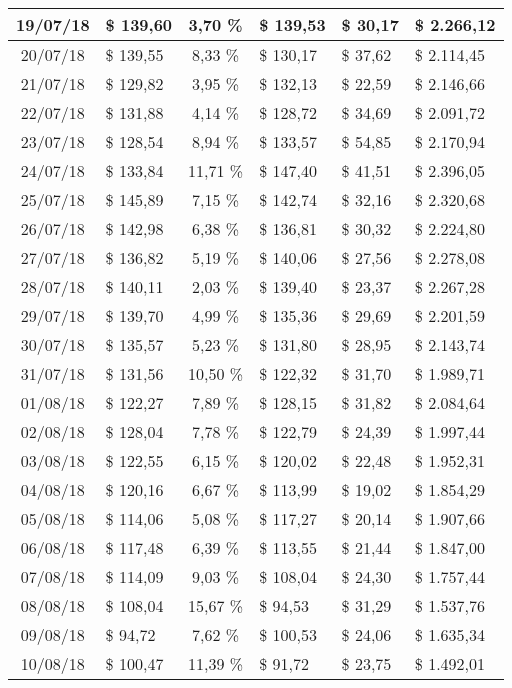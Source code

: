 \begin{center}
\begin{small}
\begin{longtable}{|c|l|c|l|l|l|}
19/07/18 & \$ 139,60 & 3,70 \% & \$ 139,53 & \$ 30,17 & \$ 2.266,12 \\ \hline
20/07/18 & \$ 139,55 & 8,33 \% & \$ 130,17 & \$ 37,62 & \$ 2.114,45 \\ \hline
21/07/18 & \$ 129,82 & 3,95 \% & \$ 132,13 & \$ 22,59 & \$ 2.146,66 \\ \hline
22/07/18 & \$ 131,88 & 4,14 \% & \$ 128,72 & \$ 34,69 & \$ 2.091,72 \\ \hline
23/07/18 & \$ 128,54 & 8,94 \% & \$ 133,57 & \$ 54,85 & \$ 2.170,94 \\ \hline
24/07/18 & \$ 133,84 & 11,71 \% & \$ 147,40 & \$ 41,51 & \$ 2.396,05 \\ \hline
25/07/18 & \$ 145,89 & 7,15 \% & \$ 142,74 & \$ 32,16 & \$ 2.320,68 \\ \hline
26/07/18 & \$ 142,98 & 6,38 \% & \$ 136,81 & \$ 30,32 & \$ 2.224,80 \\ \hline
27/07/18 & \$ 136,82 & 5,19 \% & \$ 140,06 & \$ 27,56 & \$ 2.278,08 \\ \hline
28/07/18 & \$ 140,11 & 2,03 \% & \$ 139,40 & \$ 23,37 & \$ 2.267,28 \\ \hline
29/07/18 & \$ 139,70 & 4,99 \% & \$ 135,36 & \$ 29,69 & \$ 2.201,59 \\ \hline
30/07/18 & \$ 135,57 & 5,23 \% & \$ 131,80 & \$ 28,95 & \$ 2.143,74 \\ \hline
31/07/18 & \$ 131,56 & 10,50 \% & \$ 122,32 & \$ 31,70 & \$ 1.989,71 \\ \hline
01/08/18 & \$ 122,27 & 7,89 \% & \$ 128,15 & \$ 31,82 & \$ 2.084,64 \\ \hline
02/08/18 & \$ 128,04 & 7,78 \% & \$ 122,79 & \$ 24,39 & \$ 1.997,44 \\ \hline
03/08/18 & \$ 122,55 & 6,15 \% & \$ 120,02 & \$ 22,48 & \$ 1.952,31 \\ \hline
04/08/18 & \$ 120,16 & 6,67 \% & \$ 113,99 & \$ 19,02 & \$ 1.854,29 \\ \hline
05/08/18 & \$ 114,06 & 5,08 \% & \$ 117,27 & \$ 20,14 & \$ 1.907,66 \\ \hline
06/08/18 & \$ 117,48 & 6,39 \% & \$ 113,55 & \$ 21,44 & \$ 1.847,00 \\ \hline
07/08/18 & \$ 114,09 & 9,03 \% & \$ 108,04 & \$ 24,30 & \$ 1.757,44 \\ \hline
08/08/18 & \$ 108,04 & 15,67 \% & \$ 94,53 & \$ 31,29 & \$ 1.537,76 \\ \hline
09/08/18 & \$ 94,72 & 7,62 \% & \$ 100,53 & \$ 24,06 & \$ 1.635,34 \\ \hline
10/08/18 & \$ 100,47 & 11,39 \% & \$ 91,72 & \$ 23,75 & \$ 1.492,01 \\ \hline

\end{longtable}
\end{small}
\end{center}

